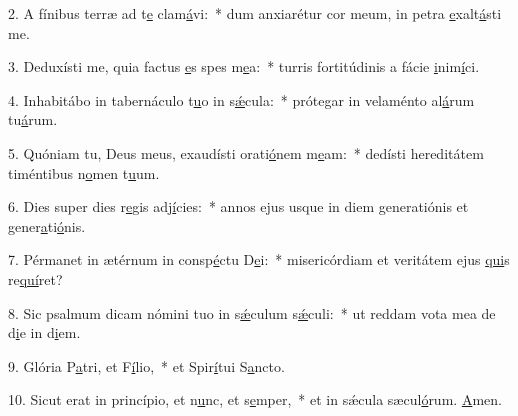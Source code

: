 2. A fínibus terræ ad t\uline{e} clam\uline{á}vi:~* dum anxiarétur cor meum, in petra \uline{e}xalt\uline{á}sti me.\par 
3. Deduxísti me, quia factus \uline{e}s spes m\uline{e}a:~* turris fortitúdinis a fácie \uline{i}nim\uline{í}ci.\par 
4. Inhabitábo in tabernáculo t\uline{u}o in s\uline{ǽ}cula:~* prótegar in velaménto al\uline{á}rum tu\uline{á}rum.\par 
5. Quóniam tu, Deus meus, exaudísti orati\uline{ó}nem m\uline{e}am:~* dedísti hereditátem timéntibus n\uline{o}men t\uline{u}um.\par 
6. Dies super dies r\uline{e}gis adj\uline{í}cies:~* annos ejus usque in diem generatiónis et gener\uline{a}ti\uline{ó}nis.\par 
7. Pérmanet in ætérnum in consp\uline{é}ctu D\uline{e}i:~* misericórdiam et veritátem ejus \uline{qui}s re\uline{quí}ret?\par 
8. Sic psalmum dicam nómini tuo in s\uline{ǽ}culum s\uline{ǽ}culi:~* ut reddam vota mea de d\uline{i}e in d\uline{i}em.\par 
9. Glória P\uline{a}tri, et F\uline{í}lio,~* et Spir\uline{í}tui S\uline{a}ncto.\par 
10. Sicut erat in princípio, et n\uline{u}nc, et s\uline{e}mper,~* et in sǽcula sæcul\uline{ó}rum. \uline{A}men.\par 
